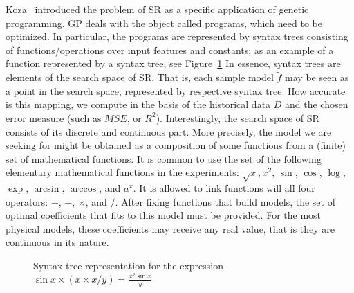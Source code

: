 \documentclass[a4paper,12pt]{elsarticle}
\begin{document}
Koza~\cite{koza1994genetic} introduced the problem of SR as a specific application of genetic programming. GP deals with the object called programs, which need to be optimized. In particular, the programs are represented by syntax trees consisting of functions/operations over input features and constants; as an example of a function represented by a syntax tree, see Figure~\ref{fig:syntax-tree-example} In essence, syntax trees are elements of the search space of SR. That is, each sample model $\tilde{f}$ may be seen as a point in the search space, represented by respective syntax tree. How accurate is this mapping, we compute in the basis of the historical data $D$ and the chosen error   measure (such as $MSE$, or $R^2$). Interestingly, the search space of SR consists of its discrete and continuous part. More precisely, the model we are seeking for might be obtained as a composition of some functions from a (finite) set of mathematical functions. It is common to use the set of the following elementary mathematical functions in the experiments: $\sqrt{x}, x^2 $, $\sin$, $\cos$, $\log$, $\exp$, $\arcsin$, $\arccos$, and $a^x$. It is allowed to link functions will all four operators: $+$, $-$, $\times$, and $/$. After fixing functions that build models, the set of optimal coefficients that  fits to this model must be provided. For the most physical models, these coefficients may receive any real value, that is they are continuous in its nature. 



\begin{figure}[!ht]
	\centering
{}

\caption{Syntax tree representation for the expression $\sin x \times   ( x \times  x / y  )  = \frac{x^2 \sin x }{y}$}
\label{fig:syntax-tree-example}
\end{figure}
\end{document}
